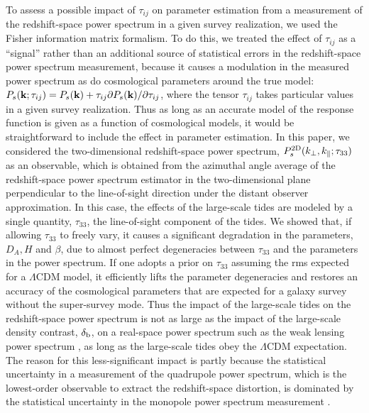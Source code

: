 \documentclass[prd,onecolumn,notitlepage,amsmath,amssymb,floatfix,superscriptaddress]{revtex4-1}
\newcommand{\bk}{{\bf k}}
\newcommand{\br}{{\rm b}}
\begin{document}
To assess a possible impact of $\tau_{ij}$ on parameter estimation from a measurement of the redshift-space power spectrum in a given survey realization, we 
used the Fisher information matrix formalism. To do this, we treated the effect of $\tau_{ij}$ as a ``signal'' rather than 
 an additional source of statistical errors in the redshift-space power spectrum measurement, because 
it causes a modulation in the measured power spectrum as do cosmological parameters around the true model: $P_s(\bk;\tau_{ij})= P_s(\bk)+\tau_{ij}\partial P_s(\bk)/\partial \tau_{ij}$, where the tensor $\tau_{ij}$ takes particular values in a given survey realization. Thus as long as an accurate model of the response function is given as a function of cosmological models, it would be straightforward to include the effect in parameter estimation. 
In this paper, we considered the two-dimensional redshift-space power spectrum, $P^{\rm 2D}_{s}(k_\perp,k_\parallel;\tau_{33})$ as an observable, which is obtained from the azimuthal angle average of the redshift-space power spectrum estimator in the two-dimensional plane perpendicular to the line-of-sight direction under the distant observer approximation. In this case, the effects of the large-scale tides are modeled by a single quantity, $\tau_{33}$, the line-of-sight component of the tides. 
We showed that, if allowing $\tau_{33}$ to freely vary, it causes a significant degradation in the parameters, 
$D_A, H$ and $\beta$, due to
almost perfect degeneracies between $\tau_{33}$ and the parameters in the power spectrum. If one adopts a prior on $\tau_{33}$ assuming 
the rms expected for a $\Lambda$CDM model, it efficiently lifts the parameter degeneracies and restores an accuracy 
of the cosmological parameters that are expected for a galaxy survey without the super-survey mode. 
Thus the impact of the large-scale tides on the redshift-space power spectrum is not as large as the impact of the large-scale density contrast, 
$\delta_\br$, on a real-space power spectrum such as the weak lensing power spectrum \citep{TakadaHu:13,Lietal:14a}, as long as the large-scale tides obey the $\Lambda$CDM expectation. 
The reason for this less-significant impact is partly because the statistical uncertainty in a measurement of the quadrupole power spectrum,
which is the lowest-order observable to extract the redshift-space distortion, is dominated by the statistical uncertainty in the 
monopole power spectrum measurement \cite{Akitsuetal:17}. 
\end{document}
